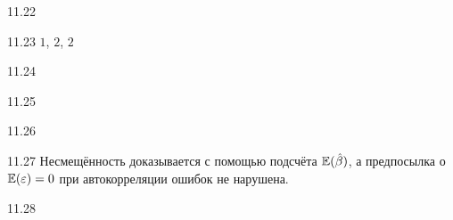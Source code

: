 \protect \hypertarget {soln:11.22}{}
\begin{solution}{{11.22}}
\end{solution}
\protect \hypertarget {soln:11.23}{}
\begin{solution}{{11.23}}
$1$, $2$, $2$
\end{solution}
\protect \hypertarget {soln:11.24}{}
\begin{solution}{{11.24}}
\end{solution}
\protect \hypertarget {soln:11.25}{}
\begin{solution}{{11.25}}
\end{solution}
\protect \hypertarget {soln:11.26}{}
\begin{solution}{{11.26}}
\end{solution}
\protect \hypertarget {soln:11.27}{}
\begin{solution}{{11.27}}
Несмещённость доказывается с помощью подсчёта $\mathbb{E}(\hat{\beta})$, а предпосылка о $\mathbb{E}(\varepsilon)=0$ при автокорреляции ошибок не нарушена.
\end{solution}
\protect \hypertarget {soln:11.28}{}
\begin{solution}{{11.28}}
\end{solution}
\protect \hypertarget {soln:11.29}{}
